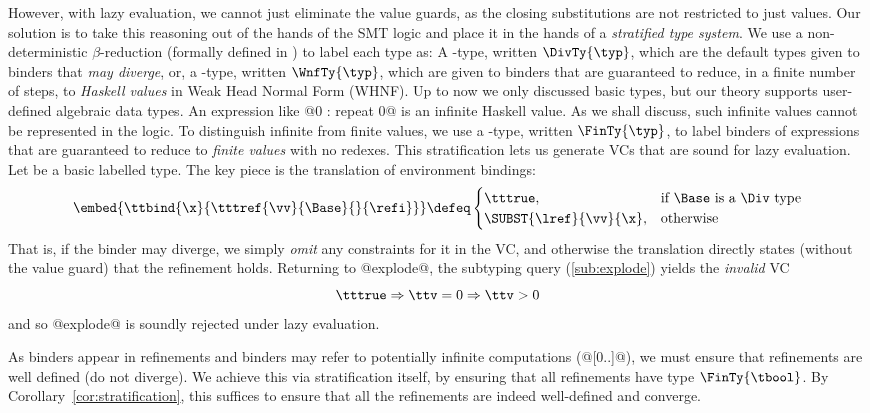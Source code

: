 However, with lazy evaluation, we cannot just 
eliminate the value guards, as the closing 
substitutions are not restricted to just values.
%
Our solution is to take this reasoning out of the 
hands of the SMT logic and place it in the hands of 
a \emph{stratified type system}.
%
We use a non-deterministic $\beta$-reduction 
(formally defined in )
to label each type as:
%
A \Div-type, written $\DivTy{\typ}$,
which are the default types given to binders 
that \emph{may diverge}, or,
%
a \Wnf-type, written $\WnfTy{\typ}$, 
which are given to binders that are guaranteed to 
reduce, in a finite number of steps, to \emph{Haskell values}
in Weak Head Normal Form (WHNF).
%
Up to now we only discussed \tint basic types, but 
our theory supports user-defined algebraic data types.
%
An expression like @0 : repeat 0@ is an infinite Haskell value.
%
As we shall discuss, such infinite values cannot be represented in the logic.
%
To distinguish infinite from finite values, we use a \Fin-type, written $\FinTy{\typ}$,
to label binders of expressions that are guaranteed to reduce to \emph{finite values} with no redexes.
This stratification lets us generate VCs that are sound 
for lazy evaluation. 
%
Let \Base be a basic labelled type. 
%
The key piece is the translation of environment bindings:
$$
\embed{\ttbind{\x}{\tttref{\vv}{\Base}{}{\refi}}} \defeq 
  \begin{cases}
    \tttrue,         & \mbox{if $\Base$ is a \Div type} \\ 
    \SUBST{\lref}{\vv}{\x}, & \mbox{otherwise}
  \end{cases}
$$
That is, if the binder may diverge, we simply \emph{omit} 
any constraints for it in the VC, and otherwise the translation 
directly states (\ie without the value guard) that the 
refinement holds.
%
Returning to @explode@, the subtyping query (\ref{sub:explode}) 
yields the \emph{invalid} VC
$$
\tttrue \Rightarrow \ttv = 0 \Rightarrow \ttv > 0
$$
and so @explode@ is soundly rejected under lazy evaluation.

As binders appear in refinements and binders may refer 
to potentially infinite computations (\eg @[0..]@), we must 
ensure that refinements are well defined (\ie do not diverge).
%
We achieve this via stratification itself, \ie by ensuring that 
all refinements have type $\FinTy{\tbool}$. By
Corollary~\ref{cor:stratification}, this suffices to ensure that 
all the refinements are indeed well-defined and converge.



